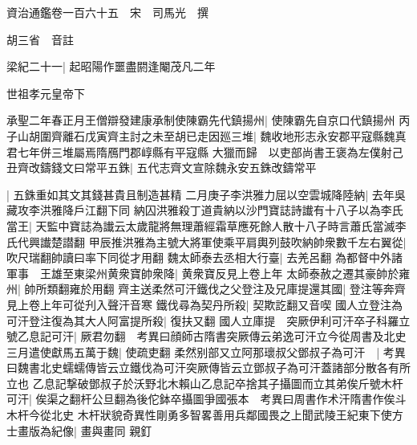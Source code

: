 






























































資治通鑑卷一百六十五　宋　司馬光　撰

胡三省　音註

梁紀二十一|{
	起昭陽作噩盡閼逢閹茂凡二年}


世祖孝元皇帝下

承聖二年春正月王僧辯發建康承制使陳霸先代鎮揚州|{
	使陳霸先自京口代鎮揚州}
丙子山胡圍齊離石戊寅齊主討之未至胡已走因廵三堆|{
	魏收地形志永安郡平寇縣魏真君七年併三堆屬焉隋鴈門郡崞縣有平寇縣}
大獵而歸　以吏部尚書王褒為左僕射己丑齊改鑄錢文曰常平五銖|{
	五代志齊文宣除魏永安五銖改鑄常平}


|{
	五銖重如其文其錢甚貴且制造甚精}
二月庚子李洪雅力屈以空雲城降陸納|{
	去年吳藏攻李洪雅降戶江翻下同}
納囚洪雅殺丁道貴納以沙門寶誌詩䜟有十八子以為李氏當王|{
	天監中寶誌為䜟云太歲龍將無理蕭經霜草應死餘人散十八子時言蕭氏當滅李氏代興䜟楚譛翻}
甲辰推洪雅為主號大將軍使乘平肩輿列鼓吹納帥衆數千左右翼從|{
	吹尺瑞翻帥讀曰率下同從才用翻}
魏太師泰去丞相大行臺|{
	去羌呂翻}
為都督中外諸軍事　王雄至東梁州黄衆寶帥衆降|{
	黄衆寶反見上卷上年}
太師泰赦之遷其豪帥於雍州|{
	帥所類翻雍於用翻}
齊主送柔然可汗鐵伐之父登注及兄庫提還其國|{
	登注等奔齊見上卷上年可從刋入聲汗音寒}
鐵伐尋為契丹所殺|{
	契欺訖翻又音喫}
國人立登注為可汗登注復為其大人阿富提所殺|{
	復扶又翻}
國人立庫提　突厥伊利可汗卒子科羅立號乙息記可汗|{
	厥君勿翻　考異曰顔師古隋書突厥傳云弟逸可汗立今從周書及北史}
三月遣使獻馬五萬于魏|{
	使疏吏翻}
柔然别部又立阿那瓌叔父鄧叔子為可汗　|{
	考異曰魏書北史蠕蠕傳皆云立鐵伐為可汗突厥傳皆云立鄧叔子為可汗蓋諸部分散各有所立也}
乙息記撃破鄧叔子於沃野北木賴山乙息記卒捨其子攝圖而立其弟俟斤號木杆可汗|{
	俟渠之翻杆公旦翻為後佗鉢卒攝圖爭國張本　考異曰周書作术汗隋書作俟斗木杆今從北史}
木杆狀貌奇異性剛勇多智畧善用兵鄰國畏之上聞武陵王紀東下使方士畫版為紀像|{
	畫與畫同}
親釘

